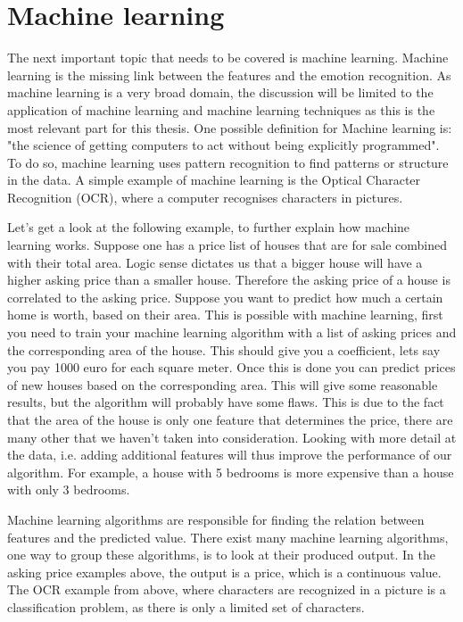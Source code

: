 \section{Machine learning}
The next important topic that needs to be covered is machine learning. Machine learning is the missing link between the features and the emotion recognition. As machine learning is a very broad domain, the discussion will be limited to the application of machine learning and machine learning techniques as this is the most relevant part for this thesis. One possible definition for Machine learning is: "the science of getting computers to act without being explicitly programmed". To do so, machine learning uses pattern recognition to find patterns or structure in the data. A simple example of machine learning is the Optical Character Recognition (OCR), where a computer recognises characters in pictures.

\npar

Let's get a look at the following example, to further explain how machine learning works. Suppose one has a price list of houses that are for sale combined with their total area. Logic sense dictates us that a bigger house will have a higher asking price than a smaller house. Therefore the asking price of a house is correlated to the asking price. Suppose you want to predict how much a certain home is worth, based on their area. This is possible with machine learning, first you need to train your machine learning algorithm with a list of asking prices and the corresponding area of the house. This should give you a coefficient, lets say you pay 1000 euro for each square meter. Once this is done you can predict prices of new houses based on the corresponding area. 
\npar
This will give some reasonable results, but the algorithm will probably have some flaws. This is due to the fact that the area of the house is only one feature that determines the price, there are many other that we haven't taken into consideration. Looking with more detail at the data, i.e. adding additional features will thus improve the performance of our algorithm. For example, a house with 5 bedrooms is more expensive than a house with only 3 bedrooms.

\npar

Machine learning algorithms are responsible for finding the relation between features and the predicted value. There exist many machine learning algorithms, one way to group these algorithms, is to look at their produced output. In the asking price examples above, the output is a price, which is a continuous value. The OCR example from above, where characters are recognized in a picture is a classification problem, as there is only a limited set of characters. 

